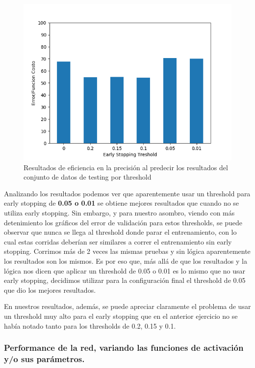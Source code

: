 \begin{figure}[!htbp]
  \begin{center}
  \includegraphics[scale=0.60]{graficos/ej2/early_stopping_testing.png}
  \caption{Resultados de eficiencia en la precisión al predecir los resultados del conjunto de datos de testing por threshold}
  \end{center}
\end{figure}

Analizando los resultados podemos ver que aparentemente usar un threshold para early stopping de \textbf{0.05 o 0.01} se obtiene mejores resultados 
que cuando no se utiliza early stopping. Sin embargo, y para nuestro asombro, viendo con más detenimiento los gráficos del error de validación para 
estos thresholds, se puede observar que nunca se llega al threshold donde parar el entrenamiento, con lo cual estas corridas deberían ser similares
a correr el entrenamiento sin early stopping. Corrimos más de 2 veces las mismas pruebas y sin lógica aparentemente los resultados son los mismos. 
Es por eso que, más allá de que los resultados y la lógica nos dicen que aplicar un threshold de 0.05 o 0.01 es lo mismo que no usar early stopping, 
decidimos utilizar para la configuración final el threshold de 0.05 que dio los mejores resultados.

En nuestros resultados, además, se puede apreciar claramente el problema de usar un threshold muy alto para el early stopping que en el anterior ejercicio
 no se había notado tanto para los thresholds de 0.2, 0.15 y 0.1.

\subsubsection{Performance de la red, variando las funciones de activación y/o sus parámetros.}



